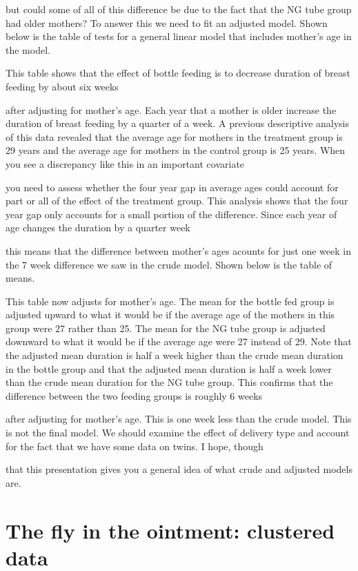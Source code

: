 \documentclass[
  letterpaper,
  DIV=11,
  numbers=noendperiod]{scrreprt}
\begin{document}
\begin{tcolorbox}
but could some of all of this difference be due to the fact that the NG
tube group had older mothers? To answer this we need to fit an adjusted
model. Shown below is the table of tests for a general linear model that
includes mother's age in the model.

This table shows that the effect of bottle feeding is to decrease
duration of breast feeding by about six weeks

after adjusting for mother's age. Each year that a mother is older
increase the duration of breast feeding by a quarter of a week. A
previous descriptive analysis of this data revealed that the average age
for mothers in the treatment group is 29 years and the average age for
mothers in the control group is 25 years. When you see a discrepancy
like this in an important covariate

you need to assess whether the four year gap in average ages could
account for part or all of the effect of the treatment group. This
analysis shows that the four year gap only accounts for a small portion
of the difference. Since each year of age changes the duration by a
quarter week

this means that the difference between mother's ages acounts for just
one week in the 7 week difference we saw in the crude model. Shown below
is the table of means.

This table now adjusts for mother's age. The mean for the bottle fed
group is adjusted upward to what it would be if the average age of the
mothers in this group were 27 rather than 25. The mean for the NG tube
group is adjusted downward to what it would be if the average age were
27 instead of 29. Note that the adjusted mean duration is half a week
higher than the crude mean duration in the bottle group and that the
adjusted mean duration is half a week lower than the crude mean duration
for the NG tube group. This confirms that the difference between the two
feeding groups is roughly 6 weeks

after adjusting for mother's age. This is one week less than the crude
model. This is not the final model. We should examine the effect of
delivery type and account for the fact that we have some data on twins.
I hope, though

that this presentation gives you a general idea of what crude and
adjusted models are.

\section{The fly in the ointment: clustered
data}\label{the-fly-in-the-ointment-clustered-data}


\end{tcolorbox}
\end{document}
